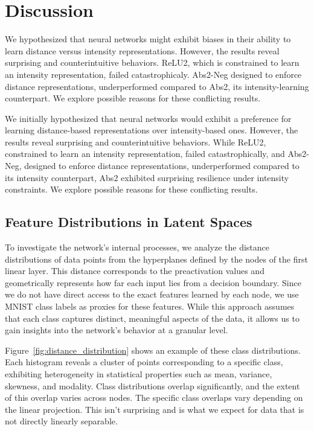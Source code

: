\section{Discussion}
\label{sec:discussion}

We hypothesized that neural networks might exhibit biases in their ability to learn distance versus intensity representations. However, the results reveal surprising and counterintuitive behaviors. ReLU2, which is constrained to learn an intensity representation, failed catastrophicaly. Abs2-Neg designed to enforce distance representations, underperformed compared to Abs2, its intensity-learning counterpart. We explore possible reasons for these conflicting results.

We initially hypothesized that neural networks would exhibit a preference for learning distance-based representations over intensity-based ones. However, the results reveal surprising and counterintuitive behaviors. While ReLU2, constrained to learn an intensity representation, failed catastrophically, and Abs2-Neg, designed to enforce distance representations, underperformed compared to its intensity counterpart, Abs2 exhibited surprising resilience under intensity constraints. We explore possible reasons for these conflicting results.

\subsection{Feature Distributions in Latent Spaces}

To investigate the network's internal processes, we analyze the distance distributions of data points from the hyperplanes defined by the nodes of the first linear layer. This distance corresponds to the preactivation values and geometrically represents how far each input lies from a decision boundary. Since we do not have direct access to the exact features learned by each node, we use MNIST class labels as proxies for these features. While this approach assumes that each class captures distinct, meaningful aspects of the data, it allows us to gain insights into the network's behavior at a granular level.

Figure~\ref{fig:distance_distribution} shows an example of these class distributions. Each histogram reveals a cluster of points corresponding to a specific class, exhibiting heterogeneity in statistical properties such as mean, variance, skewness, and modality. Class distributions overlap significantly, and the extent of this overlap varies across nodes. The specific class overlaps vary depending on the linear projection. This isn't surprising and is what we expect for data that is not directly linearly separable.

